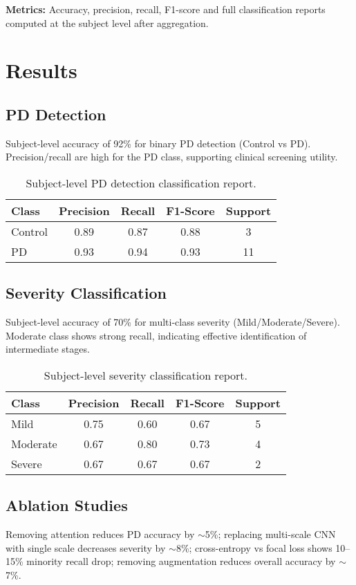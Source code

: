 \documentclass[conference]{IEEEtran}
\begin{document}
\textbf{Metrics:} Accuracy, precision, recall, F1-score and full classification reports computed at the subject level after aggregation.

\section{Results}
\subsection{PD Detection}
Subject-level accuracy of 92\% for binary PD detection (Control vs PD). Precision/recall are high for the PD class, supporting clinical screening utility.

\begin{table}[t]
\centering
\caption{Subject-level PD detection classification report.}
\label{tab:pd_report}
\begin{tabular}{lcccc}
\toprule
Class & Precision & Recall & F1-Score & Support \\
\midrule
Control & 0.89 & 0.87 & 0.88 & 3 \\
PD      & 0.93 & 0.94 & 0.93 & 11 \\
\bottomrule
\end{tabular}
\end{table}

\subsection{Severity Classification}
Subject-level accuracy of 70\% for multi-class severity (Mild/Moderate/Severe). Moderate class shows strong recall, indicating effective identification of intermediate stages.

\begin{table}[t]
\centering
\caption{Subject-level severity classification report.}
\label{tab:sev_report}
\begin{tabular}{lcccc}
\toprule
Class & Precision & Recall & F1-Score & Support \\
\midrule
Mild     & 0.75 & 0.60 & 0.67 & 5 \\
Moderate & 0.67 & 0.80 & 0.73 & 4 \\
Severe   & 0.67 & 0.67 & 0.67 & 2 \\
\bottomrule
\end{tabular}
\end{table}

\subsection{Ablation Studies}
Removing attention reduces PD accuracy by $\sim$5\%; replacing multi-scale CNN with single scale decreases severity by $\sim$8\%; cross-entropy vs focal loss shows 10--15\% minority recall drop; removing augmentation reduces overall accuracy by $\sim$7\%.
\end{document}
